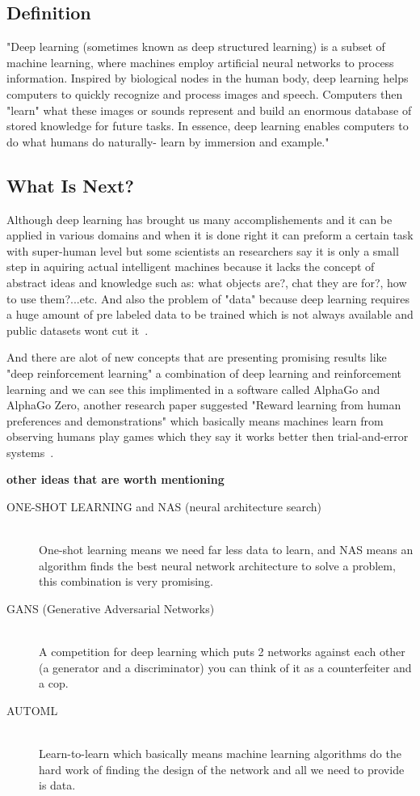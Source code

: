     \subsection{Definition}
        "Deep learning (sometimes known as deep structured learning) is a subset of machine learning, where machines employ artificial neural networks to process information. Inspired by biological nodes in the human body, deep learning helps computers to quickly recognize and process images and speech. Computers then "learn" what these images or sounds represent and build an enormous database of stored knowledge for future tasks. In essence, deep learning enables computers to do what humans do naturally- learn by immersion and example."~\cite{dl}

    \subsection{What Is Next?}
        Although deep learning has brought us many accomplishements and it can be applied in various domains and when it is done right it can preform a certain task with super-human level but some scientists an researchers say it is only a small step in aquiring actual intelligent machines because it lacks the concept of abstract ideas and knowledge such as: what objects are?, chat they are for?, how to use them?...etc.
        And also the problem of "data" because deep learning requires a huge amount of pre labeled data to be trained which is not always available and public datasets wont cut it~\cite{dl}.

        And there are alot of new concepts that are presenting promising results like "deep reinforcement learning" a combination of deep learning and reinforcement learning and we can see this implimented in a software called AlphaGo and AlphaGo Zero, another research paper suggested  "Reward learning from human preferences and demonstrations" which basically means machines learn from observing humans play games which they say it works better then trial-and-error systems~\cite{dl}.

        \bigskip \textbf{other ideas that are worth mentioning} ~\cite{dl}
            \begin{description}
            \item [ONE-SHOT LEARNING and NAS (neural architecture search)] \hfill \\
                One-shot learning means we need far less data to learn, and NAS means an algorithm finds the best neural network architecture to solve a problem, this combination is very promising.
            \item [GANS (Generative Adversarial Networks)] \hfill \\
                A competition for deep learning which puts 2 networks against each other (a generator and a discriminator) you can think of it as a counterfeiter and a cop.
            \item [AUTOML] \hfill \\
                Learn-to-learn which basically means machine learning algorithms do the hard work of finding the design of the network and all we need to provide is data.
            \end{description}


